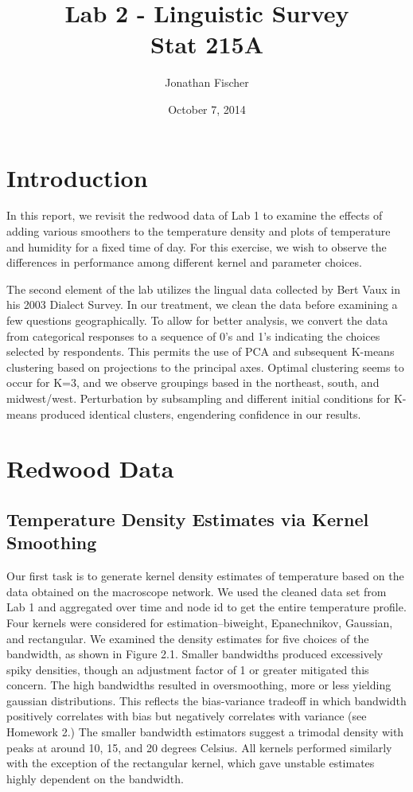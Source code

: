 \documentclass[english]{article}\usepackage{graphicx, color}
\numberwithin{equation}{section}
\numberwithin{figure}{section}
\begin{document}
\title{Lab 2 - Linguistic Survey\\
Stat 215A}


\author{Jonathan Fischer}
\date{October 7, 2014}

\maketitle


\section{Introduction}
In this report, we revisit the redwood data of Lab 1 to examine the effects of adding various smoothers to the temperature density and plots of temperature and humidity for a fixed time of day. For this exercise, we wish to observe the differences in performance among different kernel and parameter choices. 

The second element of the lab utilizes the lingual data collected by Bert Vaux in his 2003 Dialect Survey. In our treatment, we clean the data before examining a few questions geographically. To allow for better analysis, we convert the data from categorical responses to a sequence of 0's and 1's indicating the choices selected by respondents. This permits the use of PCA and subsequent K-means clustering based on projections to the principal axes. Optimal clustering seems to occur for K=3, and we observe groupings based in the northeast, south, and midwest/west. Perturbation by subsampling and different initial conditions for K-means produced identical clusters, engendering confidence in our results.

\section{Redwood Data}

\subsection{Temperature Density Estimates via Kernel Smoothing}

Our first task is to generate kernel density estimates of temperature based on the data obtained on the macroscope network. We used the cleaned data set from Lab 1 and aggregated over time and node id to get the entire temperature profile. Four kernels were considered for estimation--biweight, Epanechnikov, Gaussian, and rectangular. We examined the density estimates for five choices of the bandwidth, as shown in Figure 2.1. Smaller bandwidths produced excessively spiky densities, though an adjustment factor of 1 or greater mitigated this concern. The high bandwidths resulted in oversmoothing, more or less yielding gaussian distributions. This reflects the bias-variance tradeoff in which bandwidth positively correlates with bias but negatively correlates with variance (see Homework 2.) The smaller bandwidth estimators suggest a trimodal density with peaks at around 10, 15, and 20 degrees Celsius. All kernels performed similarly with the exception of the rectangular kernel, which gave unstable estimates highly dependent on the bandwidth. 
\end{document}

